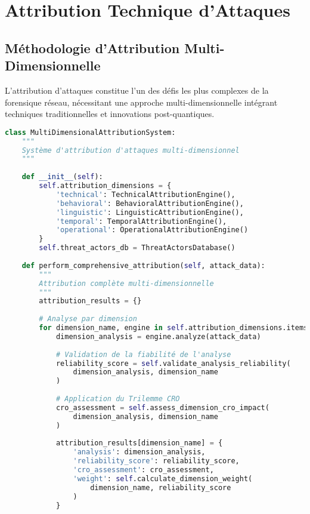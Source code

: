 \section{Attribution Technique d'Attaques}

\subsection{Méthodologie d'Attribution Multi-Dimensionnelle}

L'attribution d'attaques constitue l'un des défis les plus complexes de la forensique réseau, nécessitant une approche multi-dimensionnelle intégrant techniques traditionnelles et innovations post-quantiques.

\begin{lstlisting}[language=Python, caption=Système d'attribution multi-dimensionnel]
class MultiDimensionalAttributionSystem:
    """
    Système d'attribution d'attaques multi-dimensionnel
    """
    
    def __init__(self):
        self.attribution_dimensions = {
            'technical': TechnicalAttributionEngine(),
            'behavioral': BehavioralAttributionEngine(),
            'linguistic': LinguisticAttributionEngine(),
            'temporal': TemporalAttributionEngine(),
            'operational': OperationalAttributionEngine()
        }
        self.threat_actors_db = ThreatActorsDatabase()
        
    def perform_comprehensive_attribution(self, attack_data):
        """
        Attribution complète multi-dimensionnelle
        """
        attribution_results = {}
        
        # Analyse par dimension
        for dimension_name, engine in self.attribution_dimensions.items():
            dimension_analysis = engine.analyze(attack_data)
            
            # Validation de la fiabilité de l'analyse
            reliability_score = self.validate_analysis_reliability(
                dimension_analysis, dimension_name
            )
            
            # Application du Trilemme CRO
            cro_assessment = self.assess_dimension_cro_impact(
                dimension_analysis, dimension_name
            )
            
            attribution_results[dimension_name] = {
                'analysis': dimension_analysis,
                'reliability_score': reliability_score,
                'cro_assessment': cro_assessment,
                'weight': self.calculate_dimension_weight(
                    dimension_name, reliability_score
                )
            }
            

\end{lstlisting}
